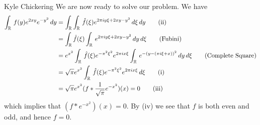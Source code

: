 \begin{solution}{Kyle Chickering}
        We are now ready to solve our problem. We have
        \begin{align*}
                \int_{\reals}\,f(y)e^{2xy}e^{-y^2}\,dy
                &= \int_{\reals}\int_{\reals}\,\hat{f}(\xi)e^{2\pi i y \xi + 2xy
                -y^2}\,d\xi \, dy \tag{\text{ii}} \\
                &= \int_{\reals}\hat{f}(\xi)\int_{\reals}\,e^{2\pi i y \xi + 2xy
                -y^2}\,dy \, d\xi \tag{\text{Fubini}} \\
                &= e^{x^2}\int_{\reals}\,\hat{f}(\xi)e^{-\pi^2\xi^2}e^{2\pi i
                x\xi}\int_{\reals}\,e^{-(y-(\pi i \xi+x))^2}\,dy\,d\xi
                \tag{\text{Complete Square}} \\
                &=\sqrt{\pi}e^{x^2}\int_{\reals}\,\hat{f}(\xi)e^{-\pi^2\xi^2}e^{2\pi i
                x\xi}\,d\xi \tag{\text{i}} \\
                &= \sqrt{\pi}e^{x^2}(f*\frac{1}{\sqrt{\pi}}e^{-x^2})(x) = 0
                \tag{\text{iii}}
        \end{align*}
        which implies that $(f*e^{-x^2})(x)=0$.
        By (iv) we see that $f$ is both even and odd, and hence $f=0$.
\end{solution}


